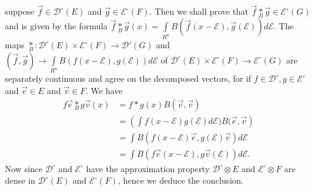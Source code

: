   suppose $\overrightarrow{f} \in \mathscr{D}^\circ(E)$ and
  $\overrightarrow{g} \in \mathcal{E}^\circ(F)$. Then we shall prove
  that $\overrightarrow{f} \underset{B}{*} \overrightarrow{g} \in
  \mathcal{E}^\circ(G)$ and is given by the formula
  $\overrightarrow{f} \underset{B}{*} \overrightarrow{g}(x) =
  \int\limits_{R^n} B(\overrightarrow{f} (x-\mathscr{E}),
  \overrightarrow{g} (\mathscr{E})) d \mathscr{E}$. The maps
  $\underset{B}{*} : \mathscr{D}^\circ(E) \times \mathcal{E}^\circ(F)
  \to \mathscr{D}'(G)$ and $(\overrightarrow{f}, \overrightarrow{g})
  \to \int\limits_{R^n} B(f(x-\mathscr{E}), g (\mathscr{E})) d
  \mathscr{E}$ of $\mathscr{D}^\circ(E) \times \mathcal{E}^\circ (F)
  \to \mathcal{E}^\circ(G)$ are separately continuous and agree on the
  decomposed vectors, for if $f \in \mathscr{D}^\circ, g \in
  \mathcal{E}^\circ$ and $\overrightarrow{e} \in E$ and
  $\overrightarrow{v} \in F$. We have
\begin{align*}
f \overrightarrow{e} \underset{B}{*} g \overrightarrow{v} (x) &= f * g
(x) B (\overrightarrow{e}, \overrightarrow{v})\\
&= \left(\int f(x-\mathscr{E}) g(\mathscr{E})d\mathscr{E})
B(\overrightarrow{e}, \overrightarrow{v}\right)\\
&= \int B(f (x-\mathscr{E}) \overrightarrow{e}, g(\mathscr{E})
\overrightarrow{v}) d\mathscr{E}\\
&= \int B (f \overrightarrow{e} (x-\mathscr{E}), g \overrightarrow{v}
(\mathscr{E})) d \mathscr{E} .
\end{align*}
Now since $\mathscr{D}^\circ$ and $\mathcal{E}^\circ$ have the
approximation property $\mathscr{D}^\circ \otimes E$ and
$\mathcal{E}^\circ \otimes F$ are dense in $\mathscr{D}^\circ(E)$ and
$\mathcal{E}^\circ(F)$, hence we deduce the conclusion. 
